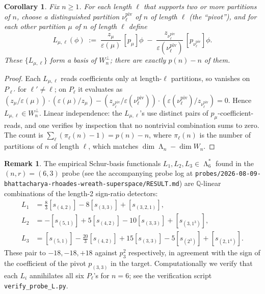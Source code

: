 \documentclass[11pt]{article}
\newtheorem{corollary}[theorem]{Corollary}
\theoremstyle{definition}
\newtheorem{remark}[theorem]{Remark}
\DeclareMathOperator{\Lam}{\Lambda}
\newcommand{\eps}{\varepsilon}
\newcommand{\QQ}{\mathbb{Q}}
\begin{document}
\begin{corollary}\label{cor:strong}
Fix $n\ge 1$. For each length $\ell$ that supports two or more partitions
of $n$, choose a distinguished partition $\nu_\ell^{\mathrm{piv}}$ of $n$ of
length $\ell$ (the ``pivot''), and for each other partition $\mu$ of $n$ of
length $\ell$ define
\[
   L_{\mu,\ell}(\phi)
   \;:=\;\frac{z_{\mu}}{\eps(\mu)}\,[p_\mu]\phi
        \;-\;\frac{z_{\nu_\ell^{\mathrm{piv}}}}{\eps(\nu_\ell^{\mathrm{piv}})}\,[p_{\nu_\ell^{\mathrm{piv}}}]\phi.
\]
These $\{L_{\mu,\ell}\}$ form a basis of $W_n^\perp$; there are exactly
$p(n)-n$ of them.
\end{corollary}

\begin{proof}
Each $L_{\mu,\ell}$ reads coefficients only at length-$\ell$ partitions,
so vanishes on $P_{\ell'}$ for $\ell'\ne\ell$; on $P_\ell$ it evaluates as
$(z_\mu/\eps(\mu))\cdot(\eps(\mu)/z_\mu)-(z_{\nu_\ell^{\mathrm{piv}}}/\eps(\nu_\ell^{\mathrm{piv}}))\cdot(\eps(\nu_\ell^{\mathrm{piv}})/z_{\nu_\ell^{\mathrm{piv}}})=0$.
Hence $L_{\mu,\ell}\in W_n^\perp$. Linear independence: the
$L_{\mu,\ell}$'s use distinct pairs of $p_\mu$-coefficient-reads, and one
verifies by inspection that no nontrivial combination sums to zero. The
count is $\sum_\ell(\pi_\ell(n)-1)=p(n)-n$, where $\pi_\ell(n)$ is the
number of partitions of $n$ of length $\ell$, which matches
$\dim\Lam_n-\dim W_n$.
\end{proof}

\begin{remark}
The empirical Schur-basis functionals $L_1,L_2,L_3\in\Lam_6^*$ found in
the $(n,r)=(6,3)$ probe (see the accompanying probe log at
\texttt{probes/2026-08-09-bhattacharya-rhoades-wreath-superspace/RESULT.md})
are $\QQ$-linear combinations of the length-2 sign-ratio detectors:
\begin{align*}
L_1 &= \tfrac{8}{3}[s_{(4,2)}] - 8[s_{(3,3)}] + [s_{(3,2,1)}],\\
L_2 &= -[s_{(5,1)}] + 5[s_{(4,2)}] - 10[s_{(3,3)}] + [s_{(3,1^3)}],\\
L_3 &= [s_{(5,1)}] - \tfrac{20}{3}[s_{(4,2)}] + 15[s_{(3,3)}] - 5[s_{(2^3)}] + [s_{(2,1^4)}].
\end{align*}
These pair to $-18,-18,+18$ against $p_3^2$ respectively, in agreement with
the sign of the coefficient of the pivot $p_{(3,3)}$ in the target.
Computationally we verify that each $L_i$ annihilates all six $P_\ell$'s
for $n=6$; see the verification script \texttt{verify\_probe\_L.py}.
\end{remark}
\end{document}
